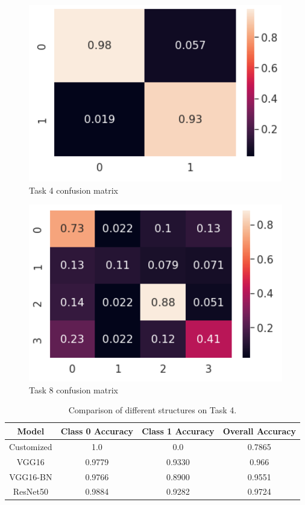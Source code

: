 \documentclass[10pt,twocolumn,letterpaper]{article}
\begin{document}
\begin{figure}[t]
\begin{center}
   \includegraphics[width=0.8\linewidth]{task4cm}
\end{center}
   \caption{Task 4 confusion matrix}
\label{fig:long5}
\end{figure}

\begin{figure}[t]
\begin{center}
   \includegraphics[width=0.8\linewidth]{task8cm}
\end{center}
   \caption{Task 8 confusion matrix}
\label{fig:long6}
\end{figure}

\begin{table}
\begin{center}
\begin{tabular}{|c|c|c|c|}
\hline
Model & Class 0 Accuracy & Class 1 Accuracy  & Overall Accuracy \\
\hline\hline
Customized & 1.0 &  0.0 & 0.7865 \\
\hline
VGG16 & 0.9779 & 0.9330 & 0.966 \\
\hline
VGG16-BN & 0.9766 & 0.8900 & 0.9551 \\
\hline
ResNet50  & 0.9884 & 0.9282 & 0.9724\\
\hline
\end{tabular}
\end{center}
\caption{Comparison of different structures on Task 4.}
\label{tab:Task4Result}
\end{table}
\end{document}
